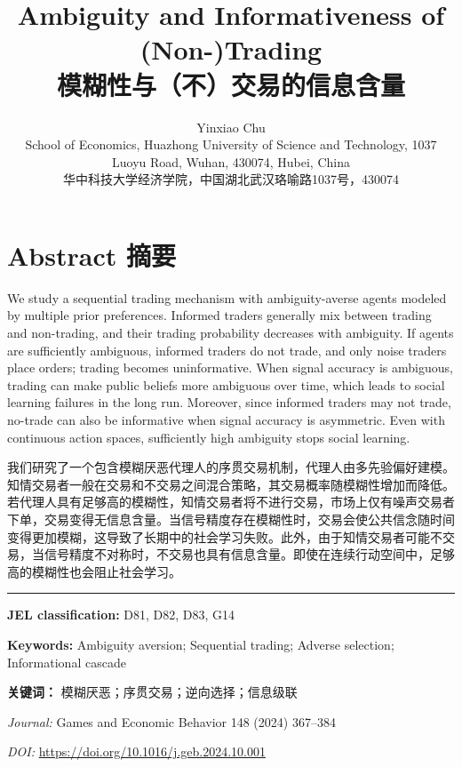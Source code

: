 \documentclass[12pt,a4paper]{article}
\title{\textbf{Ambiguity and Informativeness of (Non-)Trading\\[4pt]
\large 模糊性与（不）交易的信息含量}}
\author{Yinxiao Chu\\[3pt]
{\small School of Economics, Huazhong University of Science and Technology, 1037 Luoyu Road, Wuhan, 430074, Hubei, China}\\[3pt]
{\small 华中科技大学经济学院，中国湖北武汉珞喻路1037号，430074}}
\date{}
\newenvironment{original}{%
  \par\vspace{4pt}\noindent%
  \color{black}%
  \ignorespaces
}{%
  \par\vspace{2pt}%
}
\newenvironment{translation}{%
  \par\vspace{2pt}\noindent%
  \color{transblue}%
  \ignorespaces
}{%
  \par\vspace{4pt}\hrule\vspace{6pt}%
}
\begin{document}
\maketitle

\section*{Abstract \hfill 摘要}

\begin{original}
We study a sequential trading mechanism with ambiguity-averse agents modeled by multiple prior preferences. Informed traders generally mix between trading and non-trading, and their trading probability decreases with ambiguity. If agents are sufficiently ambiguous, informed traders do not trade, and only noise traders place orders; trading becomes uninformative. When signal accuracy is ambiguous, trading can make public beliefs more ambiguous over time, which leads to social learning failures in the long run. Moreover, since informed traders may not trade, no-trade can also be informative when signal accuracy is asymmetric. Even with continuous action spaces, sufficiently high ambiguity stops social learning.
\end{original}
\begin{translation}
我们研究了一个包含模糊厌恶代理人的序贯交易机制，代理人由多先验偏好建模。知情交易者一般在交易和不交易之间混合策略，其交易概率随模糊性增加而降低。若代理人具有足够高的模糊性，知情交易者将不进行交易，市场上仅有噪声交易者下单，交易变得无信息含量。当信号精度存在模糊性时，交易会使公共信念随时间变得更加模糊，这导致了长期中的社会学习失败。此外，由于知情交易者可能不交易，当信号精度不对称时，不交易也具有信息含量。即使在连续行动空间中，足够高的模糊性也会阻止社会学习。
\end{translation}

\medskip
\noindent\textbf{JEL classification:} D81, D82, D83, G14

\medskip
\noindent\textbf{Keywords:} Ambiguity aversion; Sequential trading; Adverse selection; Informational cascade

\noindent\textbf{关键词：} 模糊厌恶；序贯交易；逆向选择；信息级联

\medskip
\noindent\textit{Journal:} Games and Economic Behavior 148 (2024) 367--384

\noindent\textit{DOI:} \url{https://doi.org/10.1016/j.geb.2024.10.001}
\end{document}

